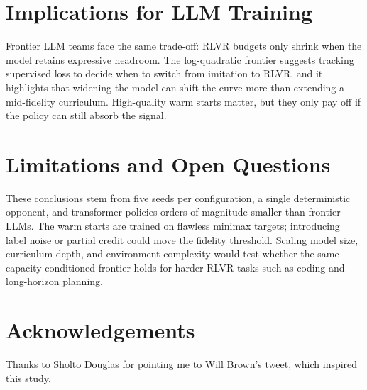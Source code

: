 \documentclass[11pt]{article}
\begin{document}
\section{Implications for LLM Training}
Frontier LLM teams face the same trade-off: RLVR budgets only shrink when the model retains expressive headroom. The log-quadratic frontier suggests tracking supervised loss to decide when to switch from imitation to RLVR, and it highlights that widening the model can shift the curve more than extending a mid-fidelity curriculum. High-quality warm starts matter, but they only pay off if the policy can still absorb the signal.

\section{Limitations and Open Questions}
These conclusions stem from five seeds per configuration, a single deterministic opponent, and transformer policies orders of magnitude smaller than frontier LLMs. The warm starts are trained on flawless minimax targets; introducing label noise or partial credit could move the fidelity threshold. Scaling model size, curriculum depth, and environment complexity would test whether the same capacity-conditioned frontier holds for harder RLVR tasks such as coding and long-horizon planning.

\section*{Acknowledgements}
Thanks to Sholto Douglas for pointing me to Will Brown's tweet, which inspired this study.
\end{document}
